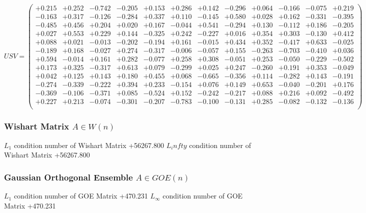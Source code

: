 \documentclass[9pt]{article}
\theoremstyle{plain}
\theoremstyle{definition}
\theoremstyle{remark}
\numberwithin{equation}{section}
\begin{document}
$U S V = \left(
\begin{array}{
cccccccccccc}
+0.215 & +0.252 & -0.742 & -0.205 & +0.153 & +0.286 & +0.142 & -0.296 & +0.064 & -0.166 & -0.075 & +0.219 \\
-0.163 & +0.317 & -0.126 & -0.284 & +0.337 & +0.110 & -0.145 & +0.580 & +0.028 & +0.162 & -0.331 & -0.395 \\
-0.485 & +0.456 & +0.204 & +0.020 & +0.167 & -0.044 & +0.541 & -0.294 & +0.130 & -0.112 & +0.186 & -0.205 \\
+0.027 & +0.553 & +0.229 & +0.144 & -0.325 & +0.242 & -0.227 & +0.016 & +0.354 & +0.303 & -0.130 & +0.412 \\
+0.088 & +0.021 & -0.013 & -0.202 & -0.194 & +0.161 & -0.015 & +0.434 & +0.352 & -0.417 & +0.633 & -0.025 \\
-0.189 & +0.168 & -0.027 & +0.274 & -0.317 & -0.006 & -0.057 & +0.155 & -0.263 & -0.703 & -0.410 & +0.036 \\
+0.594 & -0.014 & +0.161 & +0.282 & -0.077 & +0.258 & +0.308 & -0.051 & +0.253 & -0.050 & -0.229 & -0.502 \\
+0.173 & +0.325 & -0.317 & +0.613 & +0.079 & -0.299 & +0.025 & +0.247 & -0.260 & +0.191 & +0.353 & -0.049 \\
+0.042 & +0.125 & +0.143 & +0.180 & +0.455 & +0.068 & -0.665 & -0.356 & +0.114 & -0.282 & +0.143 & -0.191 \\
-0.274 & -0.339 & -0.222 & +0.394 & +0.233 & -0.154 & +0.076 & +0.149 & +0.653 & -0.040 & -0.201 & +0.176 \\
-0.369 & -0.106 & -0.371 & +0.085 & -0.524 & +0.152 & -0.242 & -0.217 & +0.088 & +0.216 & +0.092 & -0.492 \\
+0.227 & +0.213 & -0.074 & -0.301 & -0.207 & -0.783 & -0.100 & -0.131 & +0.285 & -0.082 & -0.132 & -0.136 \\
\end{array}
\right)$ \newline 

\subsubsection{Wishart Matrix $A \in W(n)$}
$L_1$ condition number of Wishart Matrix +56267.800
$L_infty$ condition number of Wishart Matrix +56267.800
\subsubsection{Gaussian Orthogonal Ensemble $A \in GOE(n)$}
$L_1$ condition number of GOE Matrix +470.231
$L_\infty$ condition number of GOE Matrix +470.231
\end{document}
